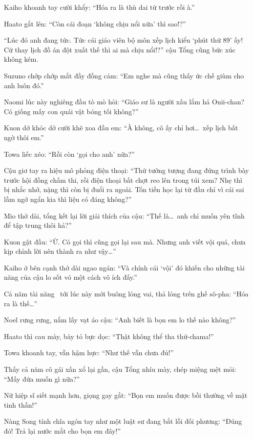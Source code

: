 \documentclass[../main.tex]{subfiles}
\begin{document}
Kaiho khoanh tay cười khẩy: ``Hóa ra là thù dai từ trước rồi à.''

Haato gắt lên: ``Còn cái đoạn `không chịu nổi nữa' thì sao!?''

``Lúc đó anh đang tức. Tức cái giáo viên bộ môn xếp lịch kiểu `phút thứ 89' ấy! Cứ thay lịch đồ án đột xuất thế thì ai mà chịu nổi!?'' cậu Tổng cũng bức xúc không kém.

Suzuno chớp chớp mắt đầy đồng cảm: ``Em nghe mà cũng thấy ức chế giùm cho anh luôn đó.''

Naomi lúc này nghiêng đầu tò mò hỏi: ``Giáo sư là người xấu lắm hả Onii-chan? Có giống mấy con quái vật bóng tối không?''

Kuon dở khóc dở cười khẽ xoa đầu em: ``À không, cô ấy chỉ hơi\dots\ xếp lịch bất ngờ thôi em.''

Towa liếc xéo: ``Rồi còn `gọi cho anh' nữa?''

Cậu giơ tay ra hiệu mô phỏng điện thoại: ``Thử tưởng tượng đang đứng trình bày trước hội đồng chấm thi, rồi điện thoại bất chợt reo lên trong túi xem? Nhẹ thì bị nhắc nhở, nặng thì còn bị đuổi ra ngoài. Tốn tiền học lại từ đầu chỉ vì cái sai lầm ngớ ngẩn kia thì liệu có đáng không?''

Mio thở dài, tổng kết lại lời giải thích của cậu: ``Thế là\dots\ anh chỉ muốn yên tĩnh để tập trung thôi hả?''

Kuon gật đầu: ``Ừ. Có gọi thì cũng gọi lại sau mà. Nhưng anh viết vội quá, chưa kịp chỉnh lời nên thành ra như vậy\dots''

Kaiho ở bên cạnh thở dài ngao ngán: ``Và chính cái `vội' đó khiến cho những tài năng của cậu lo sốt vó một cách vô ích đấy.''

Cả năm tài năng \hll\ tới lúc này mới buông lỏng vai, thả lỏng trên ghế sô-pha: ``Hóa ra là thế\dots''

Noel rưng rưng, nắm lấy vạt áo cậu: ``Anh biết là bọn em lo thế nào không?''

Haato thì cau mày, bày tỏ bực dọc: ``Thật không thể tha thứ-chama!''

Towa khoanh tay, vẫn hậm hực: ``Như thế vẫn chưa đủ!''

Thấy cả năm cô gái xấn xổ lại gần, cậu Tổng nhíu mày, chép miệng mệt mỏi: ``Mấy đứa muốn gì nữa?''

Nữ hiệp sĩ siết mạnh hơn, giọng gay gắt: ``Bọn em muốn được bồi thường về mặt tinh thần!''

Nàng Song tính chĩa ngón tay như một luật sư đang bắt lỗi đối phương: ``Đúng đó! Trả lại nước mắt cho bọn em đây!''
\end{document}
